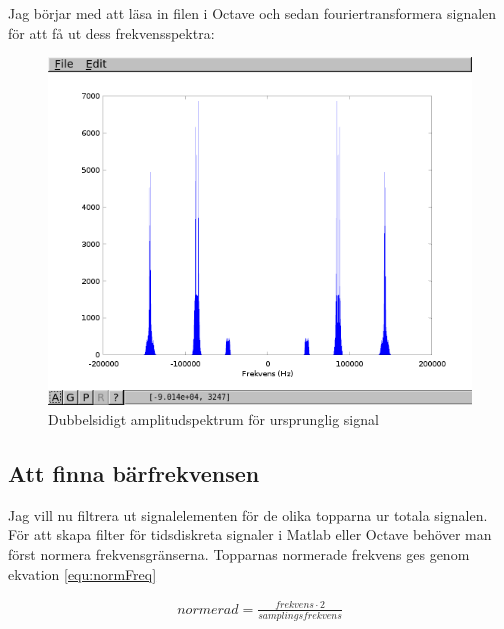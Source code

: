 \documentclass[10pt]{article}
\begin{document}
Jag börjar med att läsa in filen i Octave och sedan fouriertransformera signalen för att få ut dess frekvensspektra: 

\begin{figure}[htp]
  \begin{center}
  \includegraphics[keepaspectratio=true,width=\linewidth]{fft_orig_data.png}  %
  \end{center}
  \caption{Dubbelsidigt amplitudspektrum för ursprunglig signal} %
  \label{fig:fft_orig_data}
\end{figure}
\newpage

\subsection{Att finna bärfrekvensen}

Jag vill nu filtrera ut signalelementen för de olika topparna ur totala signalen. För att skapa filter för tidsdiskreta signaler i Matlab eller Octave behöver man först normera frekvensgränserna. Topparnas normerade frekvens ges genom ekvation \ref{equ:normFreq}

\begin{gather}
normerad = \frac{frekvens \cdot 2}{samplingsfrekvens}
\label{equ:normFreq}
\end{gather}
\end{document}
